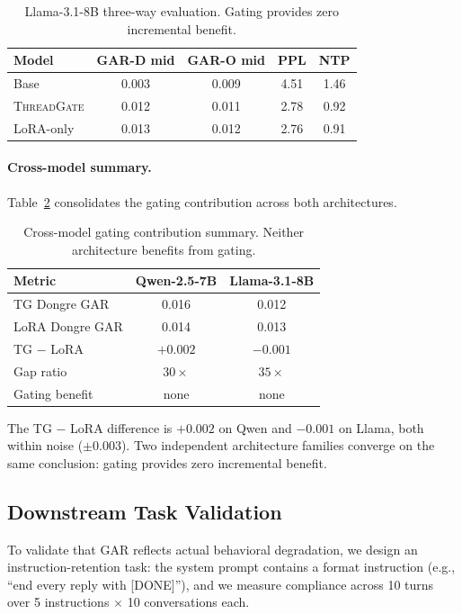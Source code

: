 \documentclass[11pt,a4paper]{article}
\newcommand{\gar}{\textsc{GAR}}
\newcommand{\tg}{\textsc{ThreadGate}}
\begin{document}
\begin{table}[H]
\centering
\caption{Llama-3.1-8B three-way evaluation. Gating provides zero incremental benefit.}
\label{tab:llama-eval}
\begin{tabular}{lcccc}
\toprule
\textbf{Model} & \textbf{GAR-D mid} & \textbf{GAR-O mid} & \textbf{PPL} & \textbf{NTP} \\
\midrule
Base      & 0.003 & 0.009 & 4.51 & 1.46 \\
\tg{}     & 0.012 & 0.011 & 2.78 & 0.92 \\
LoRA-only & 0.013 & 0.012 & 2.76 & 0.91 \\
\bottomrule
\end{tabular}
\end{table}

\paragraph{Cross-model summary.}
Table~\ref{tab:crossmodel-summary} consolidates the gating contribution across both architectures.

\begin{table}[H]
\centering
\caption{Cross-model gating contribution summary. Neither architecture benefits from gating.}
\label{tab:crossmodel-summary}
\begin{tabular}{lcc}
\toprule
\textbf{Metric} & \textbf{Qwen-2.5-7B} & \textbf{Llama-3.1-8B} \\
\midrule
TG Dongre \gar{}    & 0.016 & 0.012 \\
LoRA Dongre \gar{}  & 0.014 & 0.013 \\
TG $-$ LoRA         & $+0.002$ & $-0.001$ \\
Gap ratio           & $30\times$ & $35\times$ \\
Gating benefit      & none & none \\
\bottomrule
\end{tabular}
\end{table}

The TG $-$ LoRA difference is $+0.002$ on Qwen and $-0.001$ on Llama, both within noise ($\pm 0.003$).
Two independent architecture families converge on the same conclusion: gating provides zero incremental benefit.

\subsection{Downstream Task Validation}
\label{sec:downstream}

To validate that \gar{} reflects actual behavioral degradation, we design an instruction-retention task: the system prompt contains a format instruction (e.g., ``end every reply with [DONE]''), and we measure compliance across 10 turns over 5 instructions $\times$ 10 conversations each.
\end{document}
